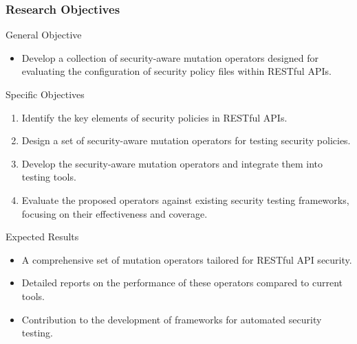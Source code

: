 \documentclass[12pt]{beamer}
\theoremstyle{remark}
\theoremstyle{definition}
\begin{document}
\begin{frame}[allowframebreaks]
\frametitle{Research Objectives}
\begin{block}{General Objective}
\begin{itemize}
    \item Develop a collection of security-aware mutation operators designed for evaluating the configuration of security policy files within RESTful APIs.
\end{itemize}
\end{block}

\begin{block}{Specific Objectives}
\begin{enumerate}
    \item Identify the key elements of security policies in RESTful APIs.
    \item Design a set of security-aware mutation operators for testing security policies.
    \item Develop the security-aware mutation operators and integrate them into testing tools.
    \item Evaluate the proposed operators against existing security testing frameworks, focusing on their effectiveness and coverage.
\end{enumerate}
\end{block}

\begin{block}{Expected Results}
\begin{itemize}
    \item A comprehensive set of mutation operators tailored for RESTful API security.
    \item Detailed reports on the performance of these operators compared to current tools.
    \item Contribution to the development of frameworks for automated security testing.
\end{itemize}
\end{block}
\end{frame}
\end{document}
